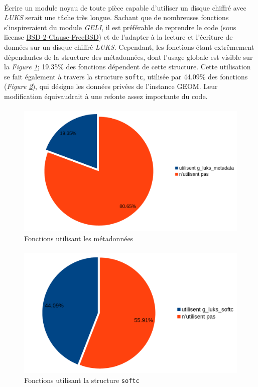 \paragraph{}
Écrire un module noyau de toute pièce capable d'utiliser un disque chiffré avec
\textit{LUKS} serait une tâche très longue. Sachant que de nombreuses fonctions
s'inspireraient du module \textit{GELI}, il est préférable de reprendre le code
(sous license \underline{BSD-2-Clause-FreeBSD}) et de l'adapter à la lecture et
l'écriture de données sur un disque chiffré \textit{LUKS}. Cependant, les
fonctions étant extrêmement dépendantes de la structure des métadonnées, dont
l'usage globale est visible sur la \textit{Figure \ref{fig:fonctions_md}};
19.35\% des fonctions dépendent de cette structure. Cette utilisation se fait
également à travers la structure \texttt{softc}, utilisée par 44.09\% des
fonctions (\textit{Figure \ref{fig:fonctions_sc}}), qui désigne les données
privées de l'instance GEOM. Leur modification équivaudrait à une refonte assez
importante du code.
\paragraph{}
\begin{figure}[h]
  \centering
  \includegraphics[width=.9\linewidth]{choix_developpement/fonctions_g_luks_metadata.png}
  \caption{\label{fig:fonctions_md}Fonctions utilisant les métadonnées}
\end{figure}
\paragraph{}
\begin{figure}[h]
  \centering
  \includegraphics[width=.9\linewidth]{choix_developpement/fonctions_g_luks_softc.png}
  \caption{\label{fig:fonctions_sc}Fonctions utilisant la structure \texttt{softc}}
\end{figure}
